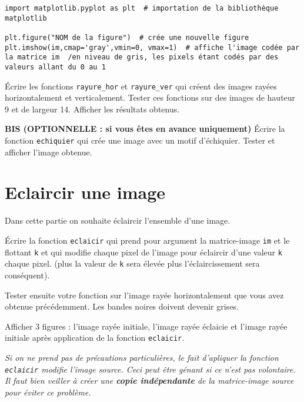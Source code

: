 \begin{lstlisting}
import matplotlib.pyplot as plt  # importation de la bibliothèque matplotlib

plt.figure("NOM de la figure")  # crée une nouvelle figure
plt.imshow(im,cmap='gray',vmin=0, vmax=1)  # affiche l'image codée par la matrice im  /en niveau de gris, les pixels étant codés par des valeurs allant du 0 au 1 
\end{lstlisting}


\begin{question}
\'Ecrire les fonctions \lstinline{rayure_hor} et \lstinline{rayure_ver} qui créent des images rayées horizontalement et verticalement. Tester ces fonctions sur des images de hauteur 9 et de largeur 14. Afficher les résultats obtenus.
\end{question}


\begin{question}
\textbf{BIS (OPTIONNELLE : si vous êtes en avance uniquement)} \'Ecrire la fonction \lstinline{echiquier} qui crée une image avec un motif d'échiquier. Tester et afficher l'image obtenue.
\end{question}


\section*{Eclaircir une image}
Dans cette partie on souhaite éclaircir l'ensemble d'une image.

\begin{question}
\'Ecrire la fonction \lstinline{eclaicir} qui prend pour argument la matrice-image \lstinline{im} et le flottant \lstinline{k} et qui modifie chaque pixel de l'image pour éclaircir d'une valeur \lstinline{k} chaque pixel. (plus la valeur de \lstinline{k} sera élevée plus l'éclaircissement sera conséquent).

Tester ensuite votre fonction sur l'image rayée horizontalement que vous avez obtenue précédemment. Les bandes noires doivent devenir grises. 

Afficher 3 figures : l'image rayée initiale, l'image rayée éclaicie et l'image rayée initiale après application de la fonction \lstinline{eclaicir}.  
\end{question}


\textit{Si on ne prend pas de précautions particulières, le fait d'apliquer la fonction \lstinline{eclaicir} modifie l'image source. Ceci peut être génant si ce n'est pas volontaire. Il faut bien veiller à créer une \textbf{copie indépendante} de la matrice-image source pour éviter ce problème.}

